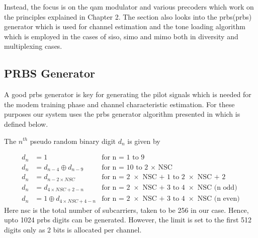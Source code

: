Instead, the focus is on the \acrshort{qam} modulator and various precoders which work on the principles explained in Chapter 2. The section also looks into the \acrlong{prbs}(\acrshort{prbs}) generator which is used for channel estimation and the tone loading algorithm which is employed in the cases of \acrshort{siso}, \acrshort{simo} and \acrshort{mimo} both in diversity and multiplexing cases.

\subsection{PRBS Generator}
A good \acrlong{prbs} generator is key for generating the pilot signals which is needed for the modem training phase and channel characteristic estimation. For these purposes our system uses the \acrshort{prbs} generator algorithm presented in \textcite{ITU2009} which is defined below.

The $n^{th}$ pseudo random binary digit $d_n$ is given by 

\begin{align*}
d_n &= 1 & \text{for n = 1 to 9}\\
d_n &= d_{n-4} \oplus d_{n-9} & \text{for n = 10 to 2 $\times$ NSC}\\
d_n &= d_{n-2 \times NSC} & \text{for n = 2 $\times$ NSC + 1 to 2 $\times$ NSC + 2}\\
d_n &= d_{4 \times NSC +2 -n} & \text{for n = 2 $\times$ NSC + 3 to 4 $\times$ NSC (n odd)}\\
d_n &= 1 \oplus d_{4 \times NSC +4 -n} & \text{for n = 2 $\times$ NSC + 3 to 4 $\times$ NSC (n even)}
\end{align*}
Here \acrshort{nsc} is the total number of subcarriers, taken to be 256 in our case. Hence, upto 1024 \acrshort{prbs} digits can be generated. However, the limit is set to the first 512 digits only as 2 bits is allocated per channel.

